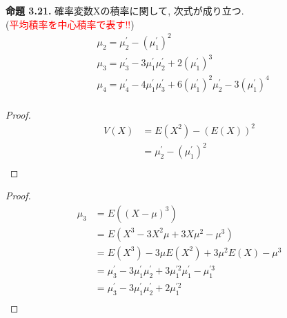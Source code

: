 \documentclass[dvipdfmx,10pt, a4j]{jarticle}
\theoremstyle{definition}
\begin{document}
\noindent
\textbf{命題 3.21.} 確率変数Xの積率に関して, 次式が成り立つ. \\
(\textcolor{red}{平均積率を中心積率で表す!!})\\
\begin{align*}
     & \mu_2 = \mu_2^{\prime} - (\mu_1^{\prime})^2                                                                         \\
     & \mu_3 = \mu_3^{\prime} - 3 \mu_1^{\prime} \mu_2^{\prime} + 2(\mu_1^{\prime})^3                                      \\
     & \mu_4 = \mu_4^{\prime} - 4 \mu_1^{\prime} \mu_3^{\prime} + 6(\mu_1^{\prime})^2 \mu_2^{\prime} - 3(\mu_1^{\prime})^4 \\
\end{align*}
\begin{proof}
    \begin{align*}
        V(X) & = E(X^2) - (E(X))^2                   \\
             & = \mu_2^{\prime} - (\mu_1^{\prime})^2 \\
    \end{align*}
\end{proof}
\begin{proof}
    \begin{align*}
        \mu_3 & = E((X- \mu )^3)                                                                                       \\
              & = E(X^3 - 3X^2\mu + 3X\mu^2 - \mu^3)                                                                   \\
              & = E(X^3) -3\mu E(X^2) + 3\mu^2 E(X) - \mu^3                                                            \\
              & = \mu_3^{\prime} - 3\mu_1^{\prime}\mu_2^{\prime} + 3\mu_1^{\prime 2} \mu_1^{\prime} - \mu_1^{\prime 3} \\
              & = \mu_3^{\prime} - 3\mu_1^{\prime}\mu_2^{\prime} + 2 \mu_1^{\prime 2}                                  \\
    \end{align*}
\end{proof}
\end{document}
